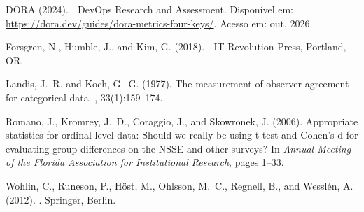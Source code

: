 \documentclass[12pt]{article}
\begin{document}
\begin{thebibliography}{}

DORA (2024).
.
\newblock DevOps Research and Assessment. Disponível em:
  \url{https://dora.dev/guides/dora-metrics-four-keys/}. Acesso em: out. 2026.

Forsgren, N., Humble, J., and Kim, G. (2018).
.
\newblock IT Revolution Press, Portland, OR.

Landis, J.~R. and Koch, G.~G. (1977).
\newblock The measurement of observer agreement for categorical data.
, 33(1):159--174.

Romano, J., Kromrey, J.~D., Coraggio, J., and Skowronek, J. (2006).
\newblock Appropriate statistics for ordinal level data: Should we really be using
  t-test and Cohen's d for evaluating group differences on the NSSE and other surveys?
\newblock In {\em Annual Meeting of the Florida Association for Institutional
  Research}, pages 1--33.

Wohlin, C., Runeson, P., H{\"o}st, M., Ohlsson, M.~C., Regnell, B., and Wessl{\'e}n,
  A. (2012).
.
\newblock Springer, Berlin.

\end{thebibliography}
\end{document}
